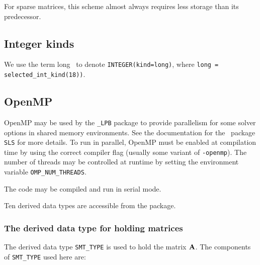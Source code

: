 \documentclass{galahad}
\newcommand{\packagename}{LPB}
\newcommand{\fullpackagename}{\libraryname\_\packagename}
\begin{document}
For sparse matrices, this scheme almost always requires less storage than
its predecessor.


\subsection{Integer kinds}\label{Integer kinds}
We use the term
long \integer\ to denote {\tt INTEGER\-(kind=long)}, where
{\tt long = selected\_int\_kind(18))}.


\subsection{OpenMP}
OpenMP may be used by the {\tt \fullpackagename} package to provide
parallelism for some solver options in shared memory environments.
See the documentation for the \galahad\ package {\tt SLS} for more details.
To run in parallel, OpenMP
must be enabled at compilation time by using the correct compiler flag
(usually some variant of {\tt -openmp}).
The number of threads may be controlled at runtime
by setting the environment variable {\tt OMP\_NUM\_THREADS}.

\noindent
The code may be compiled and run in serial mode.


\galtypes
Ten derived data types are accessible from the package.


\subsubsection{The derived data type for holding matrices}\label{typesmt}
The derived data type {\tt SMT\_TYPE} is used to hold the matrix ${\mathbf{A}}$.
The components of {\tt SMT\_TYPE} used here are:
\end{document}
